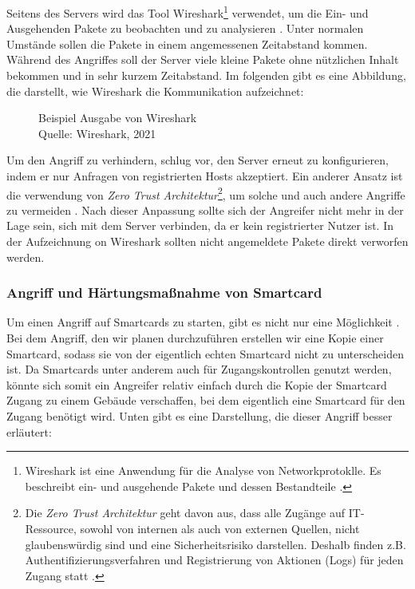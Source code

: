 Seitens des Servers wird das Tool Wireshark\footnote{Wireshark ist eine Anwendung für die Analyse von Networkprotoklle.
Es beschreibt ein- und ausgehende Pakete und dessen Bestandteile \cite{refst:wisa}.} verwendet, um die Ein- und Ausgehenden
Pakete zu beobachten und zu analysieren \cite{refart:UBEC}. Unter normalen Umstände sollen die Pakete in einem angemessenen
Zeitabstand kommen. Während des Angriffes soll der Server viele kleine Pakete ohne nützlichen Inhalt bekommen und in sehr 
kurzem Zeitabstand. Im folgenden gibt es eine Abbildung, die darstellt, wie Wireshark die Kommunikation aufzeichnet:

\begin{figure}[H]
  \caption{Beispiel Ausgabe von Wireshark \\Quelle: Wireshark, 2021}
  \label{fig:refst_wisa}
\end{figure}

Um den Angriff zu verhindern, schlug \cite{refip:NYRS} vor, den Server erneut zu konfigurieren, indem er nur Anfragen von
registrierten Hosts akzeptiert. Ein anderer Ansatz ist die verwendung von \textit{Zero Trust Architektur}\footnote{Die 
\textit{Zero Trust Architektur} geht davon aus, dass alle Zugänge auf IT-Ressource, sowohl von internen als auch von
externen Quellen, nicht glaubenswürdig sind und eine Sicherheitsrisiko darstellen. Deshalb finden z.B. Authentifizierungsverfahren
und Registrierung von Aktionen (Logs) für jeden Zugang statt \cite{refart:EBZT}.}, um solche und auch andere Angriffe 
zu vermeiden \cite{refip:LYSP}.  Nach dieser Anpassung sollte sich der Angreifer nicht mehr in der Lage sein, sich mit dem Server
verbinden, da er kein registrierter Nutzer ist. In der Aufzeichnung on Wireshark sollten nicht angemeldete Pakete direkt
verworfen werden.


\subsubsection{Angriff und Härtungsmaßnahme von Smartcard}
Um einen Angriff auf Smartcards zu starten, gibt es nicht nur eine Möglichkeit \cite{refart:TKSK}. Bei dem Angriff, den wir planen 
durchzuführen erstellen wir eine Kopie einer Smartcard, sodass sie von der eigentlich echten Smartcard nicht zu unterscheiden ist.
Da Smartcards unter anderem auch für Zugangskontrollen genutzt werden, könnte sich somit ein Angreifer relativ einfach durch 
die Kopie der Smartcard Zugang zu einem Gebäude verschaffen, bei dem eigentlich eine Smartcard für den Zugang benötigt wird.
Unten gibt es eine Darstellung, die dieser Angriff besser erläutert:


